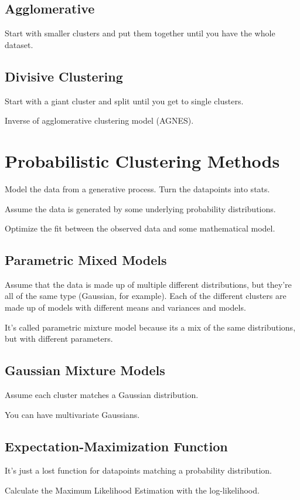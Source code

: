 \documentclass[fleqn]{report}
\begin{document}
\subsection{Agglomerative}
Start with smaller clusters and put them together until you have the whole 
dataset.

\subsection{Divisive Clustering}
Start with a giant cluster and split until you get to single clusters. 

Inverse of agglomerative clustering model (AGNES).

\section{Probabilistic Clustering Methods}
Model the data from a generative process. 
Turn the datapoints into stats. 

Assume the data is generated by some underlying probability 
distributions.

Optimize the fit between the observed data and some 
mathematical model.

\subsection{Parametric Mixed Models}
Assume that the data is made up of multiple 
different distributions, but they're all of the 
same type (Gaussian, for example). Each of the different 
clusters are made up of models with different means 
and variances and models. 

It's called parametric mixture model because its a mix of the 
same distributions, but with different parameters.

\subsection{Gaussian Mixture Models}
Assume each cluster matches a Gaussian distribution.

You can have multivariate Gaussians. 

\subsection{Expectation-Maximization Function}
It's just a lost function for datapoints matching a probability distribution.

Calculate the Maximum Likelihood Estimation with the 
log-likelihood.
\end{document}
